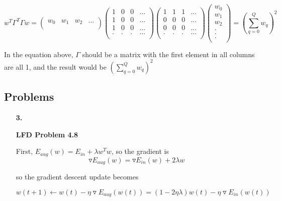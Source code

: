 \documentclass[11pt]{article}
\begin{document}
\begin{enumerate}
\begin{equation}
w^T\Gamma^T\Gamma w = 
\begin{pmatrix}
	w_0 & w_1 & w_2 & ...\\
\end{pmatrix}
\begin{pmatrix}
	1 & 0 & 0 & ... \\
	1 & 0 & 0 & ... \\
	1 & 0 & 0 & ... \\
	. & . & . & ...\\
\end{pmatrix}
\begin{pmatrix}
	1 & 1 & 1& ... \\
	0 & 0 & 0 & ... \\
	0 & 0 & 0 & ... \\
	. & . & . & ...\\
\end{pmatrix}
\begin{pmatrix}
	w_0 \\
	w_1\\
	w_2\\
	.\\
	.\\
	.\\
\end{pmatrix}
= (\sum_{q=0}^{Q}w_q)^2
\end{equation}

In the equation above, $\Gamma$ should be a matrix with the first element in all columns are all 1, and the result would be $(\sum_{q=0}^{Q}w_q)^2$




\end{enumerate}

\pagebreak

\subsection*{Problems}
\begin{enumerate}
\item[\textbf{3.}]

\textbf{LFD Problem 4.8}

First, $E_{aug}(w) = E_{in} + \lambda w^Tw$, so the gradient is $$ \triangledown E_{aug}(w) = \triangledown E_{in}(w) + 2\lambda w$$

so the gradient descent update becomes

$$w(t+1) \leftarrow w(t) - \eta \triangledown E_{aug}(w(t)) = (1 - 2 \eta \lambda)w(t) - \eta \triangledown E_{in}(w(t))$$

\end{enumerate}
\end{document}
